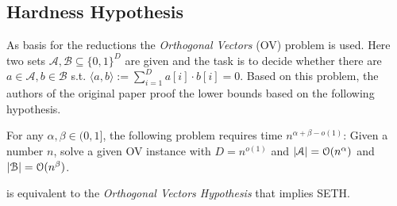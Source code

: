 \subsection{Hardness Hypothesis}
As basis for the reductions the \emph{Orthogonal Vectors} (OV) problem is used.
Here two sets $\mathcal{A}, \mathcal{B} \subseteq \{0,1\}^D$ are given and the task is to decide whether there are $a \in \mathcal{A}, b \in \mathcal{B}$ s.t. $\langle a,b \rangle := \sum_{i=1}^D a[i]\cdot b[i] = 0$.
Based on this problem, the authors of the original paper proof the lower bounds based on the following hypothesis.
%
\begin{definition}
For any $\alpha, \beta \in (0,1]$, the following problem requires time $n^{\alpha + \beta - o(1)}$:
Given a number $n$, solve a given OV instance with 
$D = n^{o(1)}$ and $|\mathcal{A}| = \mathcal{O}(n^\alpha)$ and $|\mathcal{B}| = \mathcal{O}(n^\beta)$.
\end{definition}
%
\uovh{} is equivalent to the \emph{Orthogonal Vectors Hypothesis} \cite[Lemma 5.1]{Bringman.2018} that implies SETH.


%
%


